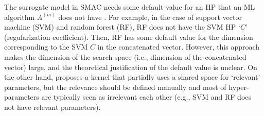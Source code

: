 %
The surrogate model in SMAC needs some default value for an HP that an ML algorithm $A^{(m)}$ does not have \cite{levesque2017bayesian}.
%
For example, in the case of support vector machine (SVM) and random forest (RF), RF does not have the SVM HP `$C$' (regularization coefficient). 
%
Then, RF has some default value for the dimension corresponding to the SVM $C$ in the concatenated vector.
%
However, this approach makes the dimension of the search space (i.e., dimension of the concatenated vector) large, and the theoretical justification of the default value is unclear.
%
On the other hand, \cite{swersky2013raiders} proposes a kernel that partially uses a shared space for `relevant' parameters, but the relevance should be defined manually and most of hyper-parameters are typically seen as irrelevant each other (e.g., SVM and RF does not have relevant parameters). 



